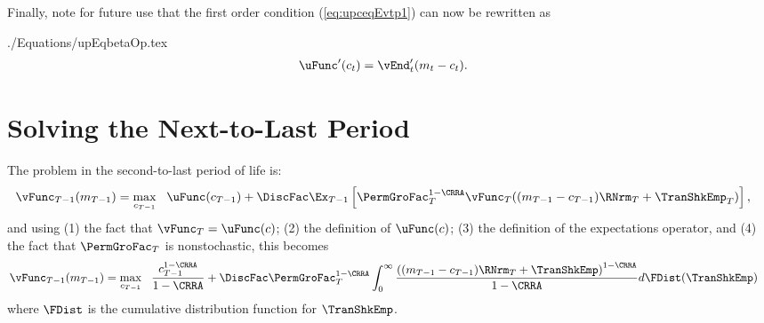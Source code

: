 \documentclass[titlepage, headings=optiontotocandhead]{\econtex}
\begin{document}
Finally, note for future use that the first order condition
(\ref{eq:upceqEvtp1}) can now be rewritten as
\begin{verbatimwrite}{./Equations/upEqbetaOp.tex}
  \begin{equation}\begin{gathered}\begin{aligned}
        \uFunc^{\prime}({c}_{t})   & = {\vEnd}_{t}^{\prime}({m}_{t}-{c}_{t}).
        \label{eq:upEqbetaOp}
      \end{aligned}\end{gathered}\end{equation}
\end{verbatimwrite}
\unskip
\hypertarget{Solving-the-Next-To-Last-Period}{}\section{Solving the Next-to-Last Period}\label{sec:NextToLast}

The problem in the second-to-last period of life is:
\begin{equation*}\begin{gathered}\begin{aligned}
      \null{\vFunc}_{T-1}({m}_{T-1})  & = \max_{{c}_{T-1}} ~~ \uFunc({c}_{T-1}) +
      \DiscFac \Ex_{T-1} \left[\PermGroFac_{T}^{1-\CRRA}\null{\vFunc}_{T}(({m}_{T-1} - {c}_{T-1})\RNrm_{T} + \TranShkEmp_{T})\right],
    \end{aligned}\end{gathered}\end{equation*}
and using (1) the fact that $\vFunc_{T}=\uFunc(c)$; (2) the definition of $\uFunc(c)$; (3) the
definition of the expectations operator, and (4) the fact that $\PermGroFac_{T}$ is nonstochastic, this becomes
\begin{equation*}\begin{gathered}\begin{aligned}
      \null{\vFunc}_{T-1}({m}_{T-1})   & = \max_{{c}_{T-1}} ~~
      \frac{{c}_{T-1}^{1-\CRRA}}{1-\CRRA} + \DiscFac \PermGroFac_{T}^{1-\CRRA}\int_{0}^{\infty}
      \frac{\left(({m}_{T-1}-{c}_{T-1})\RNrm_{T}+ \TranShkEmp\right)^{1-\CRRA}}{1-\CRRA}
      d\FDist(\TranShkEmp)
    \end{aligned}\end{gathered}\end{equation*}
where $\FDist$ is the cumulative distribution function for ${\TranShkEmp}$.
\end{document}
